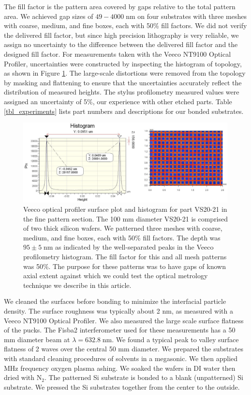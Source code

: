 \documentclass[osajnl,preprint,showpacs,superscriptaddress,12pt]{revtex4-1} %
\begin{document}
The fill factor is the pattern area covered by gaps relative to the total pattern area.  We achieved gap sizes of $49-4000\;$nm on four substrates with three meshes with coarse, medium, and fine boxes, each with 50\% fill factors.  We did not verify the delivered fill factor, but since high precision lithography is very reliable, we assign no uncertainty to the difference between the delivered fill factor and the designed fill factor.  For measurements taken with the Veeco NT9100 Optical Profiler, uncertainties were constructed by inspecting the histogram of topology, as shown in Figure \ref{figVS20pattern}.  The large-scale distortions were removed from the topology by masking and flattening to ensure that the uncertainties accurately reflect the distribution of measured heights.  The stylus profilometry measured values were assigned an uncertainty of 5\%, our experience with other etched parts.  Table \ref{tbl_experiments} lists part numbers and descriptions for our bonded substrates.

\begin{figure}[htbp]
\includegraphics[width=1.0\columnwidth]{figs/VS20fineGapCrop.pdf}
\caption{
\label{figVS20pattern}
Veeco optical profiler surface plot and histogram for part VS20-21 in the fine pattern section.  The 100 mm diameter VS20-21 is comprised of two thick silicon wafers.  We patterned three meshes with coarse, medium, and fine boxes, each with 50\% fill factors.  The depth was $95 \pm 5\;$nm as indicated by the well-separated peaks in the Veeco profilometry histogram.  The fill factor for this and all mesh patterns was 50\%.  The purpose for these patterns was to have gaps of known axial extent against which we could test the optical metrology technique we describe in this article.}
\end{figure}





We cleaned the surfaces before bonding to minimize the interfacial particle density.  The surface roughness was typically about 2 nm, as measured with a Veeco NT9100 Optical Profiler.  We also measured the large scale surface flatness of the pucks.  The Fisba2 interferometer used for these measurements has a 50 mm diameter beam at $\lambda=632.8\;$nm.  We found a typical peak to valley surface flatness of 2 waves over the central 50 mm diameter.  We prepared the substrates with standard cleaning procedures of solvents in a megasonic.  We then applied MHz frequency oxygen plasma ashing.  We soaked the wafers in DI water then dried with N$_2$.  The patterned Si substrate is bonded to a blank (unpatterned) Si substrate.  We pressed the Si substrates together from the center to the outside.
\end{document}
